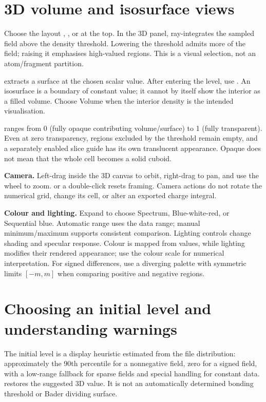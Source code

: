 \section{3D volume and isosurface views}
Choose the layout , , or  at the top. In the 3D panel,  ray-integrates the sampled field above the density threshold. Lowering the threshold admits more of the field; raising it emphasises high-valued regions. This is a visual selection, not an atom/fragment partition.

 extracts a surface at the chosen scalar value. After entering the level, use . An isosurface is a boundary of constant value; it cannot by itself show the interior as a filled volume. Choose Volume when the interior density is the intended visualisation.

 ranges from 0 (fully opaque contributing volume/surface) to 1 (fully transparent). Even at zero transparency, regions excluded by the threshold remain empty, and a separately enabled slice guide has its own translucent appearance. Opaque does not mean that the whole cell becomes a solid cuboid.

\textbf{Camera.} Left-drag inside the 3D canvas to orbit, right-drag to pan, and use the wheel to zoom.  or a double-click resets framing. Camera actions do not rotate the numerical grid, change its cell, or alter an exported charge integral.

\textbf{Colour and lighting.} Expand  to choose Spectrum, Blue-white-red, or Sequential blue. Automatic range uses the data range; manual minimum/maximum supports consistent comparison. Lighting controls change shading and specular response. Colour is mapped from values, while lighting modifies their rendered appearance; use the colour scale for numerical interpretation. For signed differences, use a diverging palette with symmetric limits $[-m,m]$ when comparing positive and negative regions.

\section{Choosing an initial level and understanding warnings}
The initial level is a display heuristic estimated from the file distribution: approximately the 90th percentile for a nonnegative field, zero for a signed field, with a low-range fallback for sparse fields and special handling for constant data.  restores the suggested 3D value. It is not an automatically determined bonding threshold or Bader dividing surface.

